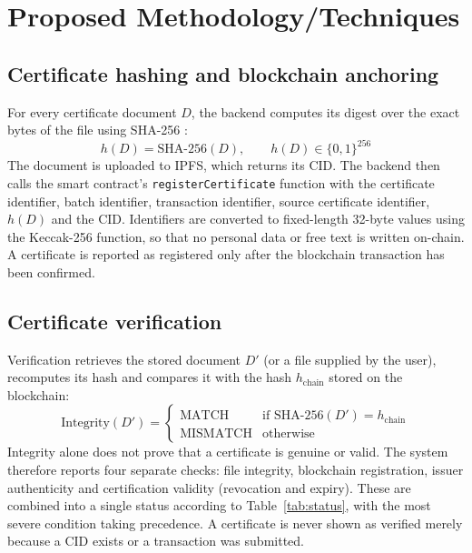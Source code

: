 \section{Proposed Methodology/Techniques}

\subsection*{Certificate hashing and blockchain anchoring}
For every certificate document $D$, the backend computes its digest over the exact bytes of the file using SHA-256 \cite{fips180}:
\begin{equation} \label{eq:hash}
	h(D) = \mathrm{SHA\text{-}256}(D), \qquad h(D) \in \{0,1\}^{256}
\end{equation}
The document is uploaded to IPFS, which returns its CID. The backend then calls the smart contract's \texttt{registerCertificate} function with the certificate identifier, batch identifier, transaction identifier, source certificate identifier, $h(D)$ and the CID. Identifiers are converted to fixed-length 32-byte values using the Keccak-256 function, so that no personal data or free text is written on-chain. A certificate is reported as registered only after the blockchain transaction has been confirmed.

\subsection*{Certificate verification}
Verification retrieves the stored document $D'$ (or a file supplied by the user), recomputes its hash and compares it with the hash $h_{\text{chain}}$ stored on the blockchain:
\begin{equation} \label{eq:verify}
	\text{Integrity}(D') =
	\begin{cases}
		\text{MATCH} & \text{if } \mathrm{SHA\text{-}256}(D') = h_{\text{chain}}\\
		\text{MISMATCH} & \text{otherwise}
	\end{cases}
\end{equation}
Integrity alone does not prove that a certificate is genuine or valid. The system therefore reports four separate checks: file integrity, blockchain registration, issuer authenticity and certification validity (revocation and expiry). These are combined into a single status according to Table~\ref{tab:status}, with the most severe condition taking precedence. A certificate is never shown as verified merely because a CID exists or a transaction was submitted.

